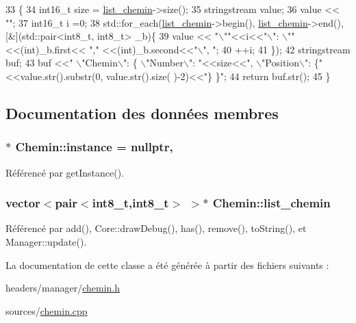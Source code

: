 \begin{DoxyCode}
33                        \{
34     int16\_t size = \hyperlink{classChemin_a5acfc655d74effb1ed6eb14494c017b0}{list\_chemin}->size();
35     stringstream value;
36     value << \textcolor{stringliteral}{""};
37     int16\_t i =0;
38     std::for\_each(\hyperlink{classChemin_a5acfc655d74effb1ed6eb14494c017b0}{list\_chemin}->begin(), \hyperlink{classChemin_a5acfc655d74effb1ed6eb14494c017b0}{list\_chemin}->end(), [&](std::pair<int8\_t,
       int8\_t> \_b)\{
39         value << \textcolor{stringliteral}{"\(\backslash\)""}<<i<<\textcolor{stringliteral}{"\(\backslash\)": \(\backslash\)""}<<(int)\_b.first<< \textcolor{stringliteral}{","} <<(\textcolor{keywordtype}{int})\_b.second<<\textcolor{stringliteral}{"\(\backslash\)", "};
40         ++i;
41     \});
42     stringstream buf;
43     buf <<\textcolor{stringliteral}{" \(\backslash\)"Chemin\(\backslash\)": \{ \(\backslash\)"Number\(\backslash\)": "}<<size<<\textcolor{stringliteral}{", \(\backslash\)"Position\(\backslash\)": \{"}<<value.str().substr(0, value.str().size(
      )-2)<<\textcolor{stringliteral}{"\} \}"};
44     \textcolor{keywordflow}{return} buf.str();
45 \}\end{DoxyCode}


\subsection{Documentation des données membres}
\hypertarget{classChemin_a068df8f068a5609d0e2db8442f5e3a38}{
\subsubsection[{instance}]{ $\ast$ Chemin\-::instance = nullptr\hspace{0.3cm}{\ttfamily [static]}, {\ttfamily [private]}}}\label{classChemin_a068df8f068a5609d0e2db8442f5e3a38}


Référencé par get\-Instance().

\hypertarget{classChemin_a5acfc655d74effb1ed6eb14494c017b0}{
\subsubsection[{list\-\_\-chemin}]{\setlength{\rightskip}{0pt plus 5cm}vector$<$pair$<$int8\-\_\-t,int8\-\_\-t$>$ $>$$\ast$ Chemin\-::list\-\_\-chemin}}\label{classChemin_a5acfc655d74effb1ed6eb14494c017b0}


Référencé par add(), Core\-::draw\-Debug(), has(), remove(), to\-String(), et Manager\-::update().



La documentation de cette classe a été générée à partir des fichiers suivants \-:\begin{DoxyCompactItemize}
\item 
headers/manager/\hyperlink{chemin_8h}{chemin.\-h}\item 
sources/\hyperlink{chemin_8cpp}{chemin.\-cpp}\end{DoxyCompactItemize}
